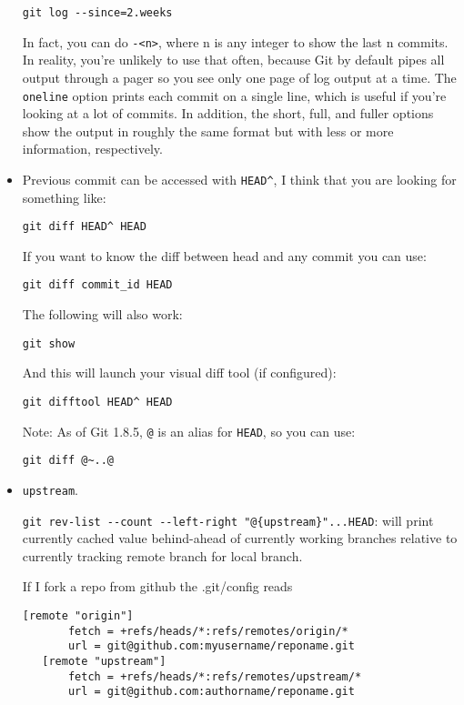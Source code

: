 \begin{itemize}
\begin{verbatim}
git log --since=2.weeks
\end{verbatim}

In fact, you can do \verb=-<n>=, where n is any integer to show the last n commits. In reality, you’re unlikely to use that often, because Git by default pipes all output through a pager so you see only one page of log output at a time. The \verb=oneline= option prints each commit on a single line, which is useful if you’re looking at a lot of commits. In addition, the short, full, and fuller options show the output in roughly the same format but with less or more information, respectively.

\item Previous commit can be accessed with \verb=HEAD^=, I think that you are looking for something like:

\begin{verbatim}
git diff HEAD^ HEAD
\end{verbatim}

If you want to know the diff between head and any commit you can use:

\begin{verbatim}
git diff commit_id HEAD
\end{verbatim}

The following will also work:

\begin{verbatim}
git show
\end{verbatim}

And this will launch your visual diff tool (if configured):

\begin{verbatim}
git difftool HEAD^ HEAD
\end{verbatim}

Note: As of Git 1.8.5, \verb=@= is an alias for \verb=HEAD=, so you can use:

\begin{verbatim}
git diff @~..@
\end{verbatim}

\item \verb=upstream=.

\verb=git rev-list --count --left-right "@{upstream}"...HEAD=: will print currently cached value behind-ahead of currently working branches relative to currently tracking remote branch for local branch.

If I fork a repo from github the .git/config reads
\begin{verbatim}
[remote "origin"]
       fetch = +refs/heads/*:refs/remotes/origin/*
       url = git@github.com:myusername/reponame.git
   [remote "upstream"]
       fetch = +refs/heads/*:refs/remotes/upstream/*
       url = git@github.com:authorname/reponame.git
\end{verbatim}


\end{itemize}
